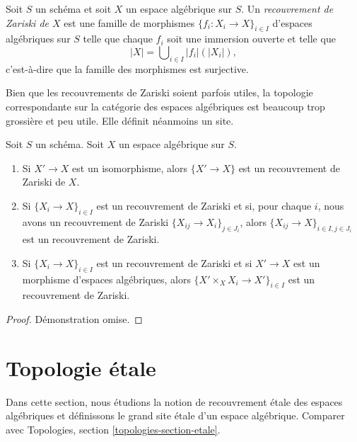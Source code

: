 \begin{definition}
\label{definition-zariski-covering}
Soit $S$ un schéma et soit $X$ un espace algébrique sur $S$.
Un {\it recouvrement de Zariski de $X$} est une famille de morphismes
$\{f_i : X_i \to X\}_{i \in I}$ d'espaces algébriques sur $S$
telle que chaque $f_i$ soit une immersion ouverte
et telle que
$$
|X| = \bigcup\nolimits_{i \in I} |f_i|(|X_i|),
$$
c'est-à-dire que la famille des morphismes est surjective.
\end{definition}

\noindent
Bien que les recouvrements de Zariski soient parfois utiles, la topologie correspondante
sur la catégorie des espaces algébriques est beaucoup trop grossière et peu
utile. Elle définit néanmoins un site.

\begin{lemma}
\label{lemma-zariski}
Soit $S$ un schéma.
Soit $X$ un espace algébrique sur $S$.
\begin{enumerate}
\item Si $X' \to X$ est un isomorphisme, alors $\{X' \to X\}$
est un recouvrement de Zariski de $X$.
\item Si $\{X_i \to X\}_{i\in I}$ est un recouvrement de Zariski et si, pour chaque
$i$, nous avons un recouvrement de Zariski $\{X_{ij} \to X_i\}_{j\in J_i}$, alors
$\{X_{ij} \to X\}_{i \in I, j\in J_i}$ est un recouvrement de Zariski.
\item Si $\{X_i \to X\}_{i\in I}$ est un recouvrement de Zariski
et si $X' \to X$ est un morphisme d'espaces algébriques, alors
$\{X' \times_X X_i \to X'\}_{i\in I}$ est un recouvrement de Zariski.
\end{enumerate}
\end{lemma}

\begin{proof}
Démonstration omise.
\end{proof}










\section{Topologie \'etale}
\label{section-etale}

\noindent
Dans cette section, nous étudions la notion de recouvrement \'etale des
espaces algébriques et définissons le grand site \'etale d'un
espace algébrique. Comparer avec
Topologies, section \ref{topologies-section-etale}.

